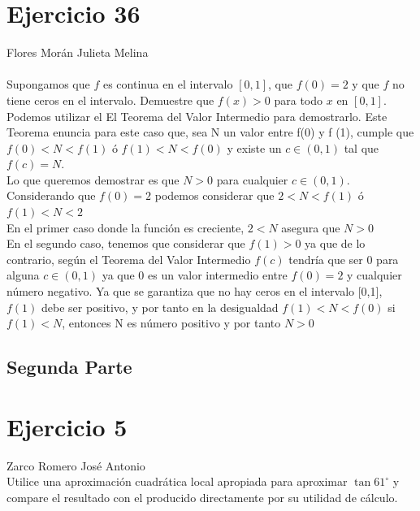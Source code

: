 \documentclass[12pt]{article}
\begin{document}
\section{Ejercicio 36}
Flores Morán Julieta Melina \\
\\
Supongamos que $f$ es continua en el intervalo $[0, 1]$, que $f(0) = 2$ y que $f$ no tiene ceros en el intervalo. Demuestre que $f(x) > 0$ para todo $x$ en $[0, 1]$.\\ 

Podemos utilizar el El Teorema del Valor Intermedio para demostrarlo. Este Teorema enuncia para este caso que, sea N un valor entre f(0) y f (1), cumple que $f(0)<N<f(1)$ ó $f(1)<N<f(0)$ y existe un $c \in (0, 1)$ tal que $f(c) = N$.\\
Lo que queremos demostrar es que $N>0$ para cualquier $c \in (0, 1)$. \\
Considerando que $f(0) = 2 $ podemos considerar que $2<N<f(1)$ ó $f(1)<N<2$  \\
En el primer caso donde la función es creciente, $2<N$ asegura que $N>0$ \\
En el segundo caso, tenemos que considerar que $f(1)>0$ ya que de lo contrario, según el Teorema del Valor Intermedio $f(c)$ tendría que ser $0$ para alguna $c \in (0, 1)$ ya que 0 es un valor intermedio entre $f(0) = 2$ y cualquier número negativo. Ya que se garantiza que no hay ceros en el intervalo [0,1], $f(1)$ debe ser positivo, y por tanto en la desigualdad  $f(1)<N<f(0)$ si $f(1)<N$, entonces N es número positivo y por tanto $N>0$
\subsection*{\centering \textbf{ \LARGE Segunda Parte}}

\section{Ejercicio 5} Zarco Romero José Antonio \\

Utilice una aproximación cuadrática local apropiada para aproximar $\tan 61^{\circ}$ y compare el resultado con el producido directamente por su utilidad de cálculo. \\
\end{document}
